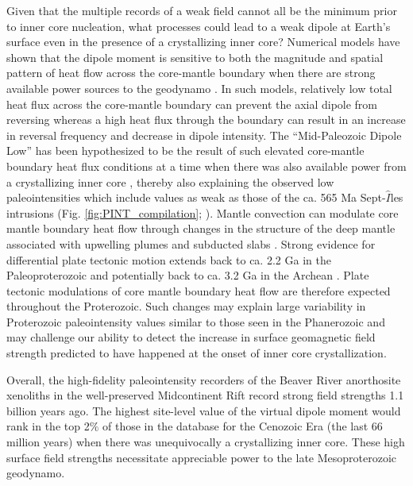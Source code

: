 \documentclass[9pt,twocolumn,twoside,lineno]{pnas-new}
\begin{document}
Given that the multiple records of a weak field cannot all be the minimum prior to inner core nucleation, what processes could lead to a weak dipole at Earth's surface even in the presence of a crystallizing inner core? Numerical models have shown that the dipole moment is sensitive to both the magnitude and spatial pattern of heat flow across the core-mantle boundary when there are strong available power sources to the geodynamo \cite{Olson2007a, Olson2010a}. In such models, relatively low total heat flux across the core-mantle boundary can prevent the axial dipole from reversing whereas a high heat flux through the boundary can result in an increase in reversal frequency and decrease in dipole intensity. The ``Mid-Paleozoic Dipole Low'' has been hypothesized to be the result of such elevated core-mantle boundary heat flux conditions at a time when there was also available power from a crystallizing inner core \cite{Hawkins2019a}, thereby also explaining the observed low paleointensities which include values as weak as those of the ca. 565 Ma Sept-$\hat{I}$les intrusions (Fig. \ref{fig:PINT_compilation}; \citealp{Bono2019a}). Mantle convection can modulate core mantle boundary heat flow through changes in the structure of the deep mantle associated with upwelling plumes \cite{Larson1991a, Courtillot2007a} and subducted slabs \cite{Tan2002b, Biggin2012a, Hounslow2018a}. Strong evidence for differential plate tectonic motion extends back to ca. 2.2 Ga in the Paleoproterozoic \cite{Mitchell2014a,Swanson-Hysell2021b} and potentially back to ca. 3.2 Ga in the Archean \cite{Brenner2020a}. Plate tectonic modulations of core mantle boundary heat flow are therefore expected throughout the Proterozoic. Such changes may explain large variability in Proterozoic paleointensity values similar to those seen in the Phanerozoic \cite{Lloyd2021a} and may challenge our ability to detect the increase in surface geomagnetic field strength predicted to have happened at the onset of inner core crystallization. 

Overall, the high-fidelity paleointensity recorders of the Beaver River anorthosite xenoliths in the well-preserved Midcontinent Rift record strong field strengths 1.1 billion years ago. The highest site-level value of the virtual dipole moment would rank in the top 2$\%$ of those in the database for the Cenozoic Era (the last 66 million years) when there was unequivocally a crystallizing inner core. These high surface field strengths necessitate appreciable power to the late Mesoproterozoic geodynamo. 
\end{document}
